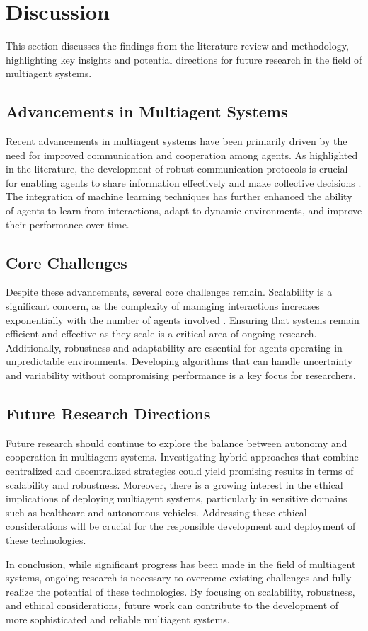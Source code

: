 \section{Discussion}
This section discusses the findings from the literature review and methodology, highlighting key insights and potential directions for future research in the field of multiagent systems.

\subsection{Advancements in Multiagent Systems}
Recent advancements in multiagent systems have been primarily driven by the need for improved communication and cooperation among agents. As highlighted in the literature, the development of robust communication protocols is crucial for enabling agents to share information effectively and make collective decisions \cite{cooperative_ai}. The integration of machine learning techniques has further enhanced the ability of agents to learn from interactions, adapt to dynamic environments, and improve their performance over time.

\subsection{Core Challenges}
Despite these advancements, several core challenges remain. Scalability is a significant concern, as the complexity of managing interactions increases exponentially with the number of agents involved \cite{scaling_rules}. Ensuring that systems remain efficient and effective as they scale is a critical area of ongoing research. Additionally, robustness and adaptability are essential for agents operating in unpredictable environments. Developing algorithms that can handle uncertainty and variability without compromising performance is a key focus for researchers.

\subsection{Future Research Directions}
Future research should continue to explore the balance between autonomy and cooperation in multiagent systems. Investigating hybrid approaches that combine centralized and decentralized strategies could yield promising results in terms of scalability and robustness. Moreover, there is a growing interest in the ethical implications of deploying multiagent systems, particularly in sensitive domains such as healthcare and autonomous vehicles. Addressing these ethical considerations will be crucial for the responsible development and deployment of these technologies.

In conclusion, while significant progress has been made in the field of multiagent systems, ongoing research is necessary to overcome existing challenges and fully realize the potential of these technologies. By focusing on scalability, robustness, and ethical considerations, future work can contribute to the development of more sophisticated and reliable multiagent systems.